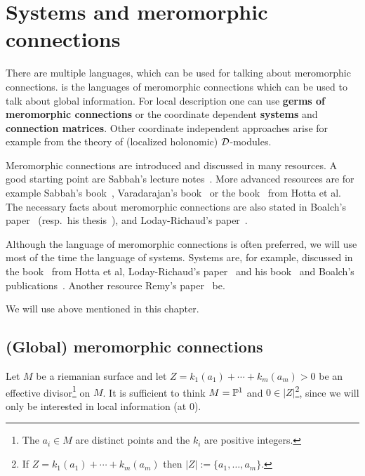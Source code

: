 \chapter{Systems and meromorphic connections}
There are multiple languages, which can be used for talking about meromorphic
connections.
 is the languages of meromorphic connections which
can be used to talk about global information.
For local description one can use \textbf{germs of meromorphic connections} or
the coordinate dependent \textbf{systems} and \textbf{connection matrices}.
Other coordinate independent approaches arise for example from the theory of
(localized holonomic) $\cD$-modules.

Meromorphic connections are introduced and discussed in many resources.
A good starting point are Sabbah's lecture notes~\cite{sabbah_cimpa90}.
More advanced resources are for example
Sabbah's book~\cite{sabbah2007isomonodromic},
Varadarajan's book~\cite{Varadarajan96linearmeromorphic} or the
book~\cite{hotta2008} from Hotta et al.
The necessary facts about meromorphic connections are also stated in
Boalch's paper~\cite{boalch} (resp.\ his thesis~\cite{thboalch}),
and Loday-Richaud's paper~\cite{Loday1994}.

Although the language of meromorphic connections is often preferred, we will
use most of the time the language of systems.
Systems are, for example, discussed in the book~\cite{hotta2008} from Hotta et
al, Loday-Richaud's paper~\cite{Loday1994} and his book~\cite{Loday2014} and
Boalch's publications~\cite{boalch,thboalch}. Another resource 
Remy's paper~\cite{Remy2014} be.

We will use  above mentioned  in this
chapter.

\section{(Global) meromorphic connections}
Let $M$ be a riemanian surface and let $Z=k_1(a_1)+\cdots+k_m(a_m)>0$ be an
effective divisor\footnote{The $a_i\in M$ are distinct points and the $k_i$ are
positive integers.} on $M$.
It is sufficient to think $M=\P^1$ and $0\in|Z|$\footnote{If
$Z=k_1(a_1)+\cdots+k_m(a_m)$ then $|Z|:=\{a_1,\dots,a_m\}$.}, since we will
only be interested in local information (at $0$).

